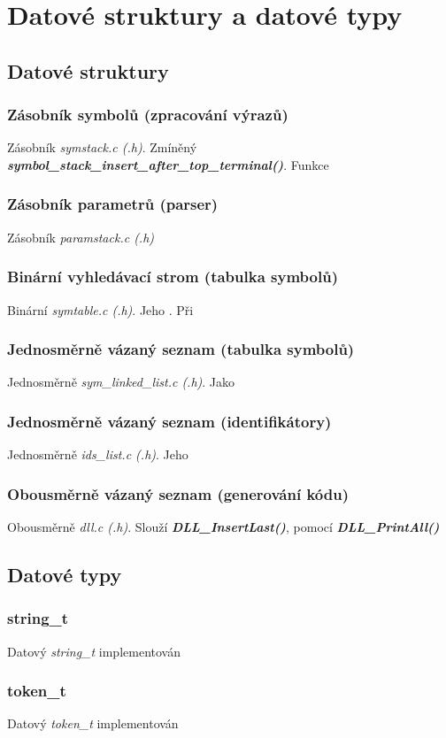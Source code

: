 \documentclass[a4paper, 12pt]{article}
\begin{document}
\section{Datové struktury a datové typy}
\subsection{Datové struktury}

\subsubsection{Zásobník symbolů (zpracování výrazů)}
Zásobník \textit{symstack.c (.h)}. Zmíněný \textit{\textbf{symbol\_stack\_insert\_after\_top\_terminal()}}. Funkce

\subsubsection{Zásobník parametrů (parser)}
Zásobník \textit{paramstack.c (.h)}

\subsubsection{Binární vyhledávací strom (tabulka symbolů)}
Binární \textit{symtable.c (.h)}. Jeho \cite{pruvodce2017}. Při 

\subsubsection{Jednosměrně vázaný seznam (tabulka symbolů)}
Jednosměrně \textit{sym\_linked\_list.c (.h)}. Jako

\subsubsection{Jednosměrně vázaný seznam (identifikátory)}
Jednosměrně \textit{ids\_list.c (.h)}. Jeho 

\subsubsection{Obousměrně vázaný seznam (generování kódu)}
Obousměrně \textit{dll.c (.h)}. Slouží \textit{\textbf{DLL\_InsertLast()}}, pomocí \textit{\textbf{DLL\_PrintAll()}}

\subsection{Datové typy}
\subsubsection{string\_t}
Datový \textit{string\_t} implementován

\subsubsection{token\_t}
Datový \textit{token\_t} implementován

\newpage



\end{document}
